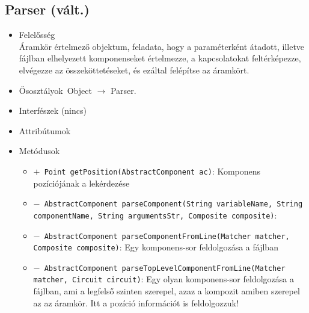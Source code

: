 \subsection{Parser (vált.)}
\begin{itemize}
\item Felelősség\\
Áramkör értelmező objektum, feladata, hogy a paraméterként átadott, illetve  fájlban elhelyezett komponenseket értelmezze, a kapcsolatokat feltérképezze,  elvégezze az összeköttetéseket, és ezáltal felépítse az áramkört.
\item Ősosztályok\ Object $\rightarrow{}$ Parser.
\item Interfészek (nincs)
\item Attribútumok $\ $
\item Metódusok$\ $
\begin{itemize}
	\item[] \texttt{$+$ Point getPosition(AbstractComponent ac)}: Komponens pozíciójának a lekérdezése
	\item[] \texttt{$-$ AbstractComponent parseComponent(String variableName, String componentName, String argumentsStr, Composite composite)}: 
	\item[] \texttt{$-$ AbstractComponent parseComponentFromLine(Matcher matcher, Composite composite)}: Egy komponens-sor feldolgozása a fájlban
	\item[] \texttt{$-$ AbstractComponent parseTopLevelComponentFromLine(Matcher matcher, Circuit circuit)}: Egy olyan komponens-sor feldolgozása a fájlban, ami a legfelső szinten szerepel,  azaz a kompozit amiben szerepel az az áramkör. Itt a pozíció információt is feldolgozzuk!
\end{itemize}
\end{itemize}